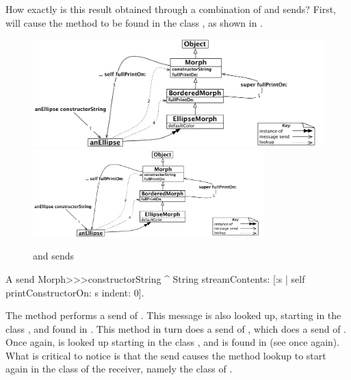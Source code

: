 \documentclass[a4paper,10pt,twoside]{book}
\begin{document}
How exactly is this result obtained through a combination of \self and \super sends?
First,  will cause the method  to be found in the class ,
as shown in .

\begin{figure}[htb]
\begin{center}
\ifluluelse
	{\includegraphics[width=\textwidth]{constructorStringLookup}}
	{\includegraphics[width=0.8\textwidth]{constructorStringLookup}}
\caption{\self and \super sends}
\end{center}
\end{figure}

\begin{method}[constructorString]{A \self send}
Morph>>>constructorString
	^ String streamContents: [:s | self printConstructorOn: s indent: 0].
\end{method}
The method  performs a \self send of .
This message is also looked up, starting in the class , and found in .
This method in turn does a \self send of , which does a \self send of .
Once again,  is looked up starting in the class , and  is found in  (see  once again).
What is critical to notice is that the \self send causes the method lookup to start again in the class of the receiver, namely the class of .
\end{document}
